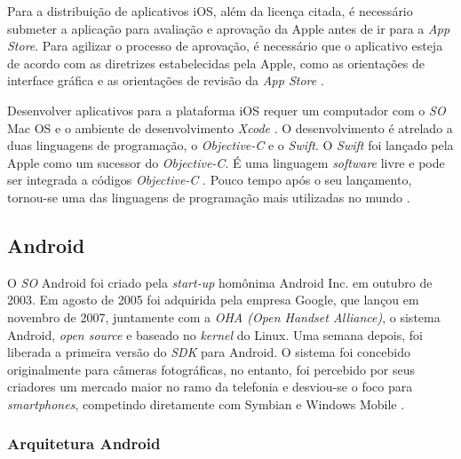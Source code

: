 Para a distribuição de aplicativos iOS, além da licença citada, é necessário submeter a aplicação para avaliação e aprovação da Apple antes de ir para a \textit{App Store}. 
Para agilizar o processo de aprovação, é necessário que o aplicativo esteja de acordo com as diretrizes estabelecidas pela Apple, como as orientações de interface gráfica e as orientações de revisão da \textit{App Store} \cite{apple_inc_submitting_2016}.

Desenvolver aplicativos para a plataforma iOS requer um computador com o \textit{SO} Mac OS e o ambiente de desenvolvimento \textit{Xcode} \cite{heitkotter_evaluating_2013}. 
O desenvolvimento é atrelado a duas linguagens de programação, o \textit{Objective-C} e o \textit{Swift}.
O \textit{Swift} foi lançado pela Apple como um sucessor do \textit{Objective-C}. É uma linguagem \textit{software} livre e pode ser integrada a códigos \textit{Objective-C} \cite{apple_inc_swift_2016}. Pouco tempo após o seu lançamento, tornou-se uma das linguagens de programação mais utilizadas no mundo \cite{rebouas_empirical_2016}. %

\subsection{Android} \label{subsection:android}

O \textit{SO} Android foi criado pela \textit{start-up} homônima Android Inc. em outubro de 2003. Em agosto de 2005 foi adquirida pela empresa Google, que lançou
em novembro de 2007, juntamente com a \textit{OHA (Open Handset Alliance)}, o sistema Android, \textit{open source} e baseado no \textit{kernel} do Linux. Uma semana depois, foi liberada a primeira versão do \textit{SDK} para Android.
O sistema foi concebido originalmente para câmeras fotográficas, no entanto, foi percebido por seus criadores um mercado maior no ramo da telefonia e desviou-se o 
foco para \textit{smartphones}, competindo diretamente com Symbian e Windows Mobile \cite{papajorgji_automated_2015}.

\subsubsection{Arquitetura Android} \label{subsection:arc-android}

